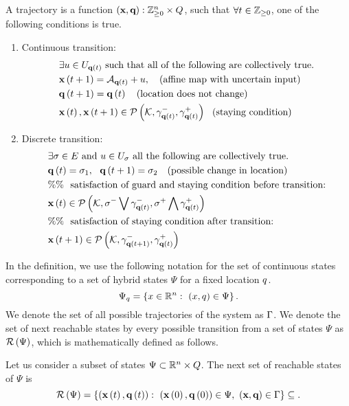 A trajectory is a function $\maphtrj:\integers_{\geq
  0}\ra\reals^n\times\locations$, such that $\forall
t\in\mathbb{Z}_{\geq 0}$, one of the following conditions is true.
%
\begin{enumerate}
\item Continuous transition:
%
\begin{align}
& \exists u\in U_{{\bf q}\left(t\right)}~\text{such that all of the following are collectively true.}\nonumber\\
& {\bf x}\left(t+1\right)=\mathcal{A}_{{\bf q}\left(t\right)}+u,~~~\text{(affine map with uncertain input)}\nonumber\\
& {\bf q}\left(t+1\right)={\bf q}\left(t\right)~~~\text{(location does not change)}\nonumber\\
& {\bf x}\left(t\right),{\bf x}\left(t+1\right)\in\mathcal{P}\left(\mathcal{K},\gamma_{{\bf q}\left(t\right)}^-,\gamma_{{\bf q}\left(t\right)}^+\right)~~\text{(staying condition)}~~\label{eqn:cont-transition}
\end{align}
\item Discrete transition:
\begin{align}
& \exists \sigma\in E~\text{and}~u\in U_{\sigma}~\text{all the following are collectively true.}\nonumber\\
& {\bf q}\left(t\right)=\sigma_1,~~{\bf q}\left(t+1\right)=\sigma_2~~~\text{(possible change in location)}\nonumber\\
& \%\%~~\text{satisfaction of guard and staying condition before transition:}\nonumber\\
& {\bf x}\left(t\right)\in\mathcal{P}\left(\mathcal{K},\sigma^-\bigvee \gamma_{{\bf q}\left(t\right)}^-,\sigma^+\bigwedge \gamma_{{\bf q}\left(t\right)}^+\right)\nonumber\\
& \%\%~~\text{satisfaction of staying condition after transition:}\nonumber\\
& {\bf x}\left(t+1\right)\in\mathcal{P}\left(\mathcal{K},\gamma_{{\bf q}\left(t+1\right)}^-,\gamma_{{\bf q}\left(t\right)}^+\right)~~\label{eqn:dis-transition}
\end{align}
\end{enumerate}
%
In the definition, we use the following notation for the set of
continuous states corresponding to a set of hybrid states $\Psi$ for a
fixed location $q$.  
%
\[
\Psi_q=\left\{x\in\mathbb{R}^n:~(x,q)\in\Psi\right\}.
\]
%
We denote the set of all possible trajectories of the system as
$\Gamma$.  We denote the set of next reachable states by every
possible transition from a set of states $\Psi$ as $\mathcal{R}\left(\Psi\right)$,
which is mathematically defined as follows.
%
\begin{definition}
  Let us consider a subset of states
  $\Psi\subset\mathbb{R}^n\times Q$.  The next set of reachable
  states of $\Psi$ is
%
\[
\mathcal{R}\left(\Psi\right)=\left\{\left({\bf x}\left(t\right),{\bf q}\left(t\right)\right):~\left({\bf x}\left(0\right),{\bf q}\left(0\right)\right)\in\Psi,~\left(\textbf{x},\textbf{q}\right)\in\Gamma\right\}\subseteq.
\]
%
\end{definition}

